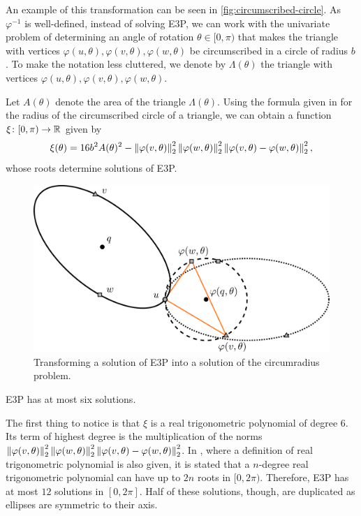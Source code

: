 An example of this transformation can be seen in \autoref{fig:circumscribed-circle}. As $\varphi^{-1}$ is well-defined, instead of solving E3P, we can work with the univariate problem of determining an angle of rotation $\theta \in [0, \pi)$ that makes the triangle with vertices $\varphi(u, \theta), \varphi(v, \theta), \varphi(w, \theta)$ be circumscribed in a circle of radius $b$. To make the notation less cluttered, we denote by $\Lambda(\theta)$ the triangle with vertices $\varphi(u, \theta), \varphi(v, \theta), \varphi(w, \theta)$.

Let $A(\theta)$ denote the area of the triangle $\Lambda(\theta)$. Using the formula given in \cite[p.~189]{johnson1960} for the radius of the circumscribed circle of a triangle, we can obtain a function $\xi \colon [0, \pi) \to \mathbb{R}$ given by
\begin{equation}\label{eq:circumscribed_circle_b}
\xi(\theta) = 16b^2A(\theta)^2 - \left\lVert\varphi(v, \theta)\right\rVert_{2}^2\left\lVert\varphi(w, \theta)\right\rVert_{2}^2\left\lVert\varphi(v, \theta)-\varphi(w, \theta)\right\rVert_{2}^2,
\end{equation}
whose roots determine solutions of E3P.

\begin{figure}
	\centering

	\includegraphics[scale=.3]{../tex/figures/circumscribed-circle}
	\caption{Transforming a solution of E3P into a solution of the circumradius problem.}
	\label{fig:circumscribed-circle}
\end{figure}

\begin{lem}\label{lema:e3p}
	E3P has at most six solutions.
\end{lem}

\begin{pf}
	The first thing to notice is that $\xi$ is a real trigonometric polynomial of degree $6$. 
	Its term of highest degree is the multiplication of the norms $\left\lVert\varphi(v, \theta)\right\rVert_{2}^2\left\lVert\varphi(w, \theta)\right\rVert_{2}^2\left\lVert\varphi(v, \theta)-\varphi(w, \theta)\right\rVert_{2}^2$. In \cite[p.~150]{powell}, where a definition of real trigonometric polynomial is also given, it is stated that a $n$-degree real trigonometric polynomial can have up to $2n$ roots in $[0, 2\pi)$. Therefore, E3P has at most $12$ solutions in $[0, 2\pi]$.
	Half of these solutions, though, are duplicated as ellipses are symmetric to their axis.
\end{pf}

